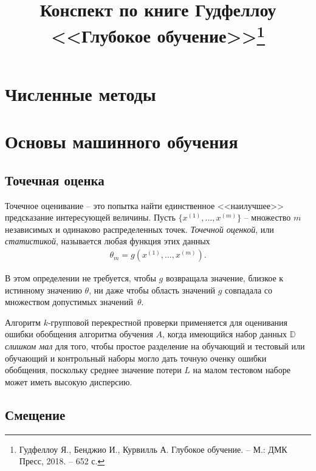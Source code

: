 \documentclass[%
	11pt,
	a4paper,
	utf8,
]{article}
\begin{document}
\title{Конспект по книге Гудфеллоу <<Глубокое обучение>>\footnote{Гудфеллоу Я., Бенджио И., Курвилль А. Глубокое обучение. -- М.: ДМК Пресс, 2018. -- 652 с. }}

\author{}

\date{}
\maketitle

\thispagestyle{fancy}

\tableofcontents

\section{Численные методы}

\section{Основы машинного обучения}

\subsection{Точечная оценка}

Точечное оценивание -- это попытка найти единственное <<наилучшее>> предсказание интересующей величины. Пусть $ \{ x^{(1)}, \ldots, x^{(m)} \} $ -- множество $ m $ независимых и одинаково распределенных точек. \emph{Точечной оценкой}, или \emph{статистикой}, называется любая функция этих данных
\begin{align*}
	\theta_m = g(x^{(1)}, \ldots, x^{(m)}).
\end{align*}

В этом определении не требуется, чтобы $ g $ возвращала значение, близкое к истинному значению $ \theta $, ни даже чтобы область значений $ g $ совпадала со множеством допустимых значений~$ \theta $.

Алгоритм $ k $-групповой перекрестной проверки применяется для оценивания ошибки обобщения алгоритма обучения $ A $, когда имеющийся набор данных $ \mathbb{D} $ \emph{слишком мал} для того, чтобы простое разделение на обучающий и тестовый или обучающий и контрольный наборы могло дать точную оченку ошибки обобщения, поскольку среднее значение потери $ L $ на малом тестовом наборе может иметь высокую дисперсию. 

\subsection{Смещение}
\end{document}
